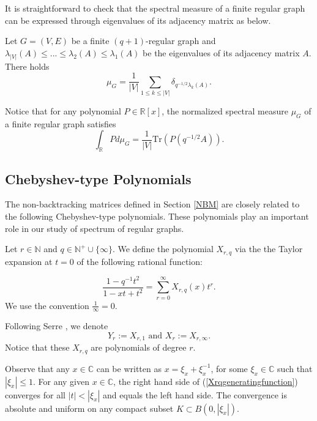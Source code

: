 \documentclass{article}
\begin{document}
It is straightforward to check that the spectral measure of a finite regular graph can be expressed through eigenvalues of its adjacency matrix as below.     

\begin{lemma}
    Let $G=(V,E)$ be a finite $(q+1)$-regular graph and  $\lambda_{|V|}(A) \leq ... \leq \lambda_2(A) \leq \lambda_1(A)$ be the eigenvalues of its adjacency matrix $A$. There holds
    \begin{equation*}
    \mu_G=\frac{1}{|V|}\sum_{1\leq k\leq |V|}\delta_{q^{-1/2} \lambda_k(A)}.
\end{equation*}
\end{lemma}
Notice that for any polynomial $P\in \mathbb{R}[x]$, the normalized spectral measure $\mu_G$ of a finite regular graph satisfies
\begin{equation*}
    \int_\mathbb{R} P d\mu_G= \frac{1}{|V|}\mathrm{Tr}( P(q^{-1/2}A)).
\end{equation*}





\subsection{Chebyshev-type Polynomials}\label{subsection:Chebyshev}

The non-backtracking matrices defined in Section \ref{NBM} are closely related to the following Chebyshev-type polynomials. These polynomials play an important role in our study of spectrum of regular graphs.

\begin{definition}
    Let $r\in \mathbb{N}$ and $q\in \mathbb{N}^+ \cup \{\infty\}$. We define the polynomial $X_{r,q}$ via the the Taylor expansion at $t=0$ of the following  rational function:
    
    \begin{equation}\label{Xrqgeneratingfunction}
    \frac{1-q^{-1}t^2}{1-xt+t^2}=\sum_{r=0}^{\infty}X_{r,q}(x)t^{r}.
    \end{equation}
    We use the convention $\frac{1}{\infty}=0$.
\end{definition}
 Following Serre \cite{Ser02}, we denote 
 \begin{equation}
     Y_r:=X_{r,1}\,\,\text{and}\,\, X_r:=X_{r,\infty}.
 \end{equation}
Notice that these $X_{r,q}$ are polynomials of degree $r$.

\begin{remark}
    Observe that any $x\in \mathbb{C}$ can be written as $x=\xi_x+\xi_x^{-1}$, for some $\xi_x\in \mathbb{C}$ such that $|\xi_x|\leq 1$. For any given $x\in \mathbb{C}$, the right hand side of (\ref{Xrqgeneratingfunction}) converges for all $|t|<|\xi_x|$ and equals the left hand side. The convergence is absolute and uniform on any compact subset $K \subset B(0, |\xi_x|)$.
\end{remark}
\end{document}
